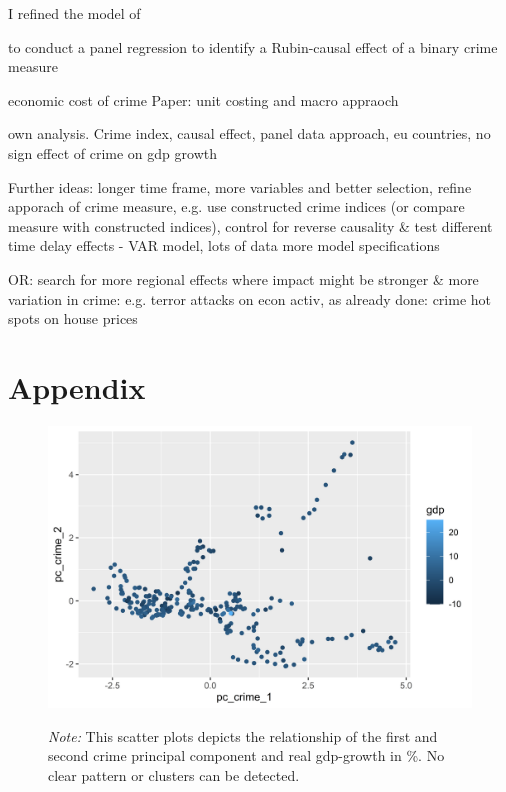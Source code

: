 \documentclass[a4paper,12pt]{article}
\begin{document}
I refined the model of \cite{entorf} 

to conduct a panel regression to identify a Rubin-causal effect of a binary crime measure 


economic cost of crime
Paper: unit costing and macro appraoch

own analysis. Crime index, causal effect, panel data approach, eu countries, no sign effect of crime on gdp growth



Further ideas: longer time frame, more variables and better selection, refine apporach of crime measure, e.g. use constructed crime indices (or compare measure with constructed indices), control for reverse causality 
\& test different time delay effects - VAR model, lots of data
 more model specifications
 
OR: search for more regional effects where impact might be stronger \& more variation in crime: e.g. terror attacks on econ activ,  as already done: crime hot spots on house prices
 
\clearpage


   

\newpage

\section*{Appendix}




\begin{figure}
\begin{minipage}{0.9\textwidth}
  \includegraphics[trim={0 0 0 0},width=\linewidth]{charts/scatter_pca.png}
\begin{flushleft}
\footnotesize{\textit{Note:} This scatter plots depicts the relationship of the first and second crime principal component and real gdp-growth in \%. No clear pattern or clusters can be detected.
\label{fig:scatter_pca}	
}
\end{flushleft}
\end{minipage}
\end{figure}
\end{document}

